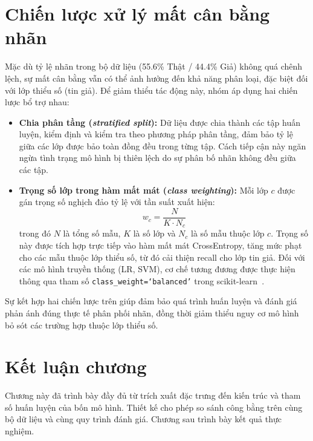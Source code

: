 \documentclass[12pt, a4paper]{report}
\newcommand{\pctReal}{55.6}              %
\newcommand{\pctFake}{44.4}              %
\begin{document}
\section{Chiến lược xử lý mất cân bằng nhãn}

Mặc dù tỷ lệ nhãn trong bộ dữ liệu (\pctReal\% Thật / \pctFake\% Giả) không quá chênh lệch, sự mất cân bằng vẫn có thể ảnh hưởng đến khả năng phân loại, đặc biệt đối với lớp thiểu số (tin giả). Để giảm thiểu tác động này, nhóm áp dụng hai chiến lược bổ trợ nhau:

\begin{itemize}[leftmargin=2em]
  \item \textbf{Chia phân tầng (\textit{stratified split}):} Dữ liệu được chia thành các tập huấn luyện, kiểm định và kiểm tra theo phương pháp phân tầng, đảm bảo tỷ lệ giữa các lớp được bảo toàn đồng đều trong từng tập. Cách tiếp cận này ngăn ngừa tình trạng mô hình bị thiên lệch do sự phân bố nhãn không đều giữa các tập.
  
  \item \textbf{Trọng số lớp trong hàm mất mát (\textit{class weighting}):} Mỗi lớp $c$ được gán trọng số nghịch đảo tỷ lệ với tần suất xuất hiện:
  \[
    w_c = \frac{N}{K \cdot N_c}
  \]
  trong đó $N$ là tổng số mẫu, $K$ là số lớp và $N_c$ là số mẫu thuộc lớp $c$. Trọng số này được tích hợp trực tiếp vào hàm mất mát CrossEntropy, tăng mức phạt cho các mẫu thuộc lớp thiểu số, từ đó cải thiện recall cho lớp tin giả. Đối với các mô hình truyền thống (LR, SVM), cơ chế tương đương được thực hiện thông qua tham số \texttt{class\_weight=`balanced'} trong scikit-learn~\cite{pedregosa2011sklearn}.
\end{itemize}

Sự kết hợp hai chiến lược trên giúp đảm bảo quá trình huấn luyện và đánh giá phản ánh đúng thực tế phân phối nhãn, đồng thời giảm thiểu nguy cơ mô hình bỏ sót các trường hợp thuộc lớp thiểu số.

\section{Kết luận chương}

Chương này đã trình bày đầy đủ từ trích xuất đặc trưng đến kiến trúc và tham số huấn luyện của bốn mô hình. Thiết kế cho phép so sánh công bằng trên cùng bộ dữ liệu và cùng quy trình đánh giá. Chương sau trình bày kết quả thực nghiệm.

\clearpage
\end{document}
